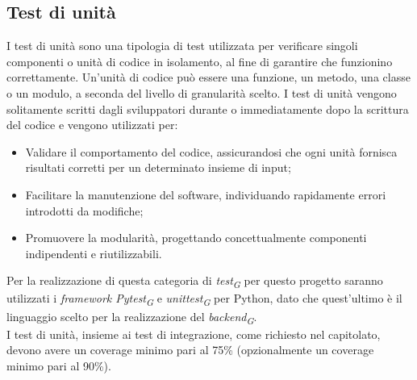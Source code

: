 \subsection{Test di unità}
I test di unità sono una tipologia di test utilizzata per verificare singoli componenti o unità di codice in isolamento, al fine di garantire che funzionino correttamente. Un'unità di codice può essere una funzione, un metodo, una classe o un modulo, a seconda del livello di granularità scelto. I test di unità vengono solitamente scritti dagli sviluppatori durante o immediatamente dopo la scrittura del codice e vengono utilizzati per:
\begin{itemize}
    \item Validare il comportamento del codice, assicurandosi che ogni unità fornisca risultati corretti per un determinato insieme di input;
    \item Facilitare la manutenzione del software, individuando rapidamente errori introdotti da modifiche;
    \item Promuovere la modularità, progettando concettualmente componenti indipendenti e riutilizzabili.
\end{itemize}
Per la realizzazione di questa categoria di \textit{test\textsubscript{G}} per questo progetto saranno utilizzati i \textit{framework Pytest\textsubscript{G}} e \textit{unittest\textsubscript{G}} per Python, dato che quest'ultimo è il linguaggio scelto per la realizzazione del \textit{backend\textsubscript{G}}.\\
I test di unità, insieme ai test di integrazione, come richiesto nel capitolato, devono avere un coverage minimo pari al 75\% (opzionalmente un coverage minimo pari al 90\%).

